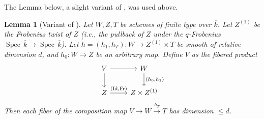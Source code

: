 \documentclass[reqno]{amsart}
\numberwithin{equation}{section}
\newcommand{\wt}[1]{\widetilde{#1}}
\newcommand{\co}{\colon}
\DeclareMathOperator{\Frob}{Fr}
\DeclareMathOperator{\Spec}{Spec\,}
\DeclareMathOperator{\Id}{Id}
\newcommand{\ov}{\overline}
\newcommand\xr{\xrightarrow}
\newtheorem{lemma}[thm]{Lemma}
\theoremstyle{remark}
\numberwithin{equation}{section}
\begin{document}
The Lemma below, a slight variant of \cite[Lemma 2.13]{Laff18}, was used above.

\begin{lemma}[Variant of {\cite[Lemma 2.13]{Laff18}}]\label{l:VL}
Let $W,Z, T$ be schemes of finite type over $\ov{k}$. Let $Z^{(1)}$ be the Frobenius twist of $Z$ (i.e., the pullback of $Z$ under the $q$-Frobenius $\Spec \ov{k}\to \Spec \ov{k}$). Let $\wt h = (h_1, h_T) \co W \rightarrow Z^{(1)} \times T$ be smooth of relative dimension $d$, and $h_{0}\co W \rightarrow Z$ be an arbitrary map. Define $V$ as the fibered product
\[
\begin{tikzcd}
V \ar[r] \ar[d] & W \ar[d, "{(h_{0},h_{1})}"] \\
Z \ar[r, "{(\Id, \Frob)}"] & Z \times Z^{(1)}
\end{tikzcd}
\]
Then  each fiber of the composition map $V \rightarrow W\xr{h_{T}}T$ has dimension $\le d$. 
\end{lemma}
\end{document}
